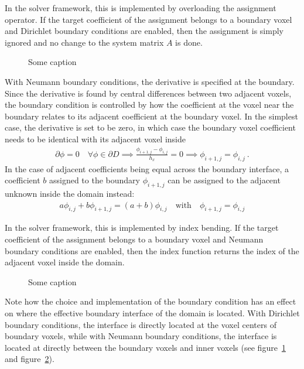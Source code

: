 In the solver framework, this is implemented by overloading the assignment operator. If the target coefficient of the assignment belongs to a boundary voxel and Dirichlet boundary conditions are enabled, then the assignment is simply ignored and no change to the system matrix $A$ is done.
\begin{figure}[h]
\centering
{}
\caption{Some caption}
\label{fig:pn_bc_dirichlet}
\end{figure}

With Neumann boundary conditions, the derivative is specified at the boundary. Since the derivative is found by central differences between two adjacent voxels, the boundary condition is controlled by how the coefficient at the voxel near the boundary relates to its adjacent coefficient at the boundary voxel. In the simplest case, the derivative is set to be zero, in which case the boundary voxel coefficient needs to be identical with its adjacent voxel inside
\begin{align*}
\partial\phi=0\quad\forall\phi\in\partial D
\implies
\frac{\phi_{i+1,j}-\phi_{i,j}}{h_x} = 0
\implies
\phi_{i+1,j}=\phi_{i,j}
\ .
\end{align*}
In the case of adjacent coefficients being equal across the boundary interface, a coefficient $b$ assigned to the boundary $\phi_{i+1,j}$ can be assigned to the adjacent unknown inside the domain instead:
\begin{align}
a\phi_{i,j} + b\phi_{i+1,j} = \left(a+b\right)\phi_{i,j}
\quad \text{with}\quad \phi_{i+1,j}=\phi_{i,j}
\end{align}

In the solver framework, this is implemented by index bending. If the target coefficient of the assignment belongs to a boundary voxel and Neumann boundary conditions are enabled, then the index function returns the index of the adjacent voxel inside the domain.
\begin{figure}[h]
\centering
{}
\caption{Some caption}
\label{fig:pn_bc_neumann}
\end{figure}

Note how the choice and implementation of the boundary condition has an effect on where the effective boundary interface of the domain is located. With Dirichlet boundary conditions, the interface is directly located at the voxel centers of boundary voxels, while with Neumann boundary conditions, the interface is located at directly between the boundary voxels and inner voxels (see figure~\ref{fig:pn_bc_dirichlet} and figure~\ref{fig:pn_bc_neumann}).

